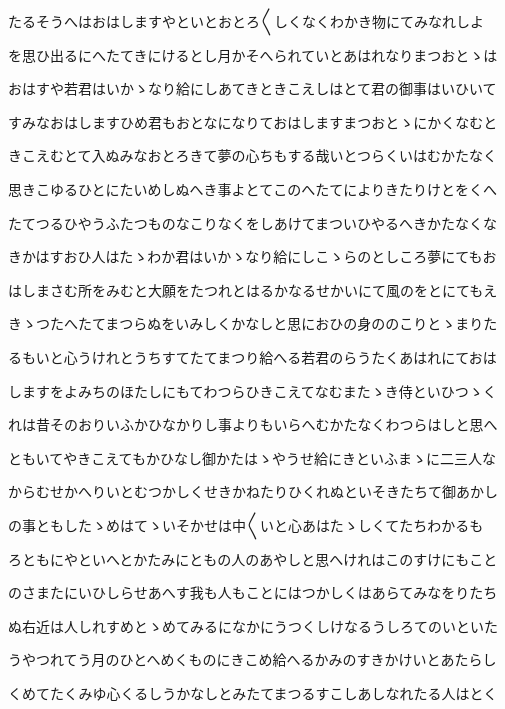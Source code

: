 \documentclass[a4paper,11pt,landscape]{ltjtarticle}
\begin{document}
\par\medskip
たるそうへはおはしますやといとおとろ〱しくなくわかき物にてみなれしよ
\par\medskip
を思ひ出るにへたてきにけるとし月かそへられていとあはれなりまつおとゝは
\par\medskip
おはすや若君はいかゝなり給にしあてきときこえしはとて君の御事はいひいて
\par\medskip
すみなおはしますひめ君もおとなになりておはしますまつおとゝにかくなむと
\par\medskip
きこえむとて入ぬみなおとろきて夢の心ちもする哉いとつらくいはむかたなく
\par\medskip
思きこゆるひとにたいめしぬへき事よとてこのへたてによりきたりけとをくへ
\par\medskip
たてつるひやうふたつものなこりなくをしあけてまついひやるへきかたなくな
\par\medskip
きかはすおひ人はたゝわか君はいかゝなり給にしこゝらのとしころ夢にてもお
\par\medskip
はしまさむ所をみむと大願をたつれとはるかなるせかいにて風のをとにてもえ
\par\medskip
きゝつたへたてまつらぬをいみしくかなしと思におひの身ののこりとゝまりた
\par\medskip
るもいと心うけれとうちすてたてまつり給へる若君のらうたくあはれにておは
\par\medskip
しますをよみちのほたしにもてわつらひきこえてなむまたゝき侍といひつゝく
\par\medskip
れは昔そのおりいふかひなかりし事よりもいらへむかたなくわつらはしと思へ
\par\medskip
ともいてやきこえてもかひなし御かたはゝやうせ給にきといふまゝに二三人な
\par\medskip
からむせかへりいとむつかしくせきかねたりひくれぬといそきたちて御あかし
\par\medskip
の事ともしたゝめはてゝいそかせは中〱いと心あはたゝしくてたちわかるも
\par\medskip
ろともにやといへとかたみにともの人のあやしと思へけれはこのすけにもこと
\par\medskip
のさまたにいひしらせあへす我も人もことにはつかしくはあらてみなをりたち
\par\medskip
ぬ右近は人しれすめとゝめてみるになかにうつくしけなるうしろてのいといた
\par\medskip
うやつれてう月のひとへめくものにきこめ給へるかみのすきかけいとあたらし
\par\medskip
くめてたくみゆ心くるしうかなしとみたてまつるすこしあしなれたる人はとく
\end{document}
